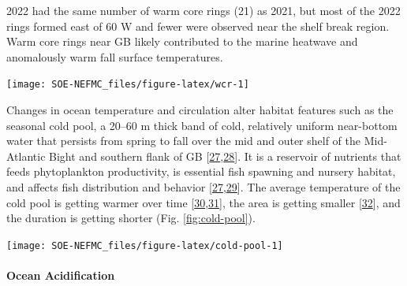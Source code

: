 \documentclass[
  10pt,
]{article}
\let\origfigure\figure
\let\endorigfigure\endfigure
\renewenvironment{figure}[1][2] {
    \expandafter\origfigure\expandafter[H]
} {
    \endorigfigure
}
\begin{document}
2022 had the same number of warm core rings (21) as 2021, but most of the 2022 rings formed east of 60 W and fewer were observed near the shelf break region. Warm core rings near GB likely contributed to the marine heatwave and anomalously warm fall surface temperatures.

\begin{figure}

{\centering \texttt{[image: SOE-NEFMC\_files/figure-latex/wcr-1]} 

}

\caption{Annual number of warm core ring formation on the Northeast U.S. Shelf.}\label{fig:wcr}
\end{figure}

Changes in ocean temperature and circulation alter habitat features such as the seasonal cold pool, a 20--60 m thick band of cold, relatively uniform near-bottom water that persists from spring to fall over the mid and outer shelf of the Mid-Atlantic Bight and southern flank of GB {[}\protect\hyperlink{ref-lentz_seasonal_2017}{27},\protect\hyperlink{ref-chen_seasonal_2018}{28}{]}. It is a reservoir of nutrients that feeds phytoplankton productivity, is essential fish spawning and nursery habitat, and affects fish distribution and behavior {[}\protect\hyperlink{ref-lentz_seasonal_2017}{27},\protect\hyperlink{ref-miles_offshore_2021}{29}{]}. The average temperature of the cold pool is getting warmer over time {[}\protect\hyperlink{ref-miller_state-space_2016}{30},\protect\hyperlink{ref-du_pontavice_incorporating_nodate}{31}{]}, the area is getting smaller {[}\protect\hyperlink{ref-friedland_middle_2022}{32}{]}, and the duration is getting shorter (Fig. \ref{fig:cold-pool}).

\begin{figure}

{\centering \texttt{[image: SOE-NEFMC\_files/figure-latex/cold-pool-1]} 

}

\caption{Seasonal cold pool indices: mean temperature within the cold pool, cold pool persistence, and spatial extent.}\label{fig:cold-pool}
\end{figure}

\hypertarget{ocean-acidification}{%
\paragraph{Ocean Acidification}\label{ocean-acidification}}
\end{document}
